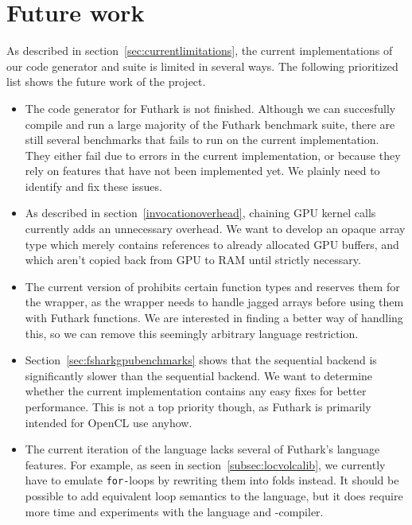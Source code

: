 \section*{Future work}
As described in section~\ref{sec:currentlimitations}, the current
implementations of our code generator and \fshark{} suite is limited in several
ways. The following prioritized list shows the future work of the \fshark{}
project.
\begin{itemize}
\item The \csharp{} code generator for Futhark is not finished. Although we can
  succesfully compile and run a large majority of the Futhark benchmark suite,
  there are still several benchmarks that fails to run on the current implementation.
  They either fail due to errors in the current implementation, or because they rely on features that
  have not been implemented yet.
  We plainly need to identify and fix these issues.

\item As described in section~\ref{invocationoverhead}, chaining GPU kernel
  calls currently adds an unnecessary overhead. We want to develop an opaque
  array type which merely contains references to already allocated GPU buffers,
  and which aren't copied back from GPU to RAM until strictly necessary.

\item The current version of \fshark{} prohibits certain function types and
  reserves them for the \fshark{} wrapper, as the wrapper needs to handle jagged
  arrays before using them with \csharp{} Futhark functions.
  We are interested in finding a better way of handling this, so we can remove
  this seemingly arbitrary language restriction.
  
\item Section~\ref{sec:fsharkgpubenchmarks} shows that the sequential \csharp{}
  backend is significantly slower than the sequential \C{} backend. We want to
  determine whether the current implementation contains any easy fixes for
  better performance. This is not a top priority though, as Futhark is primarily
  intended for OpenCL use anyhow.

\item The current iteration of the \fshark{} language lacks several of Futhark's
  language features.
  For example, as seen in section~\ref{subsec:locvolcalib}, we currently have to emulate \texttt{for-}loops by rewriting them into folds instead.
  It should be possible to add equivalent loop semantics to the \fshark{} language,
  but it does require more time and experiments with the \fsharp{} language and -compiler.


\end{itemize}
